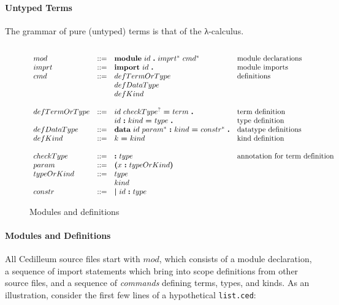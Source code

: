 \documentclass{article}
\begin{document}
\paragraph{Untyped Terms}
The grammar of pure (untyped) terms is that of the λ-calculus.

\begin{figure}[h]
  \[
    \begin{array}{llll}
      \\ mod
      & ::= & \textbf{module}\ id\ \textbf{.}\ imprt^*\ cmd^*\
      & \textnormal{module declarations}
      \\ imprt
      & ::= & \textbf{import}\ id\ \textbf{.}
      & \textnormal{module imports}
      \\ cmd
      & ::= & defTermOrType
      & \textnormal{definitions}
      \\ & & defDataType
      \\ & & defKind
      \\ 
      \\ defTermOrType
      & ::= & id\ checkType^?\ \textbf{=}\ term\ \textbf{.}
      & \textnormal{term definition}
      \\ & & id\ \textbf{:}\ kind\ \textbf{=}\ type\ \textbf{.}
      & \textnormal{type definition}
      \\ defDataType
      & ::= & \textbf{data}\ id\ param^*\ \textbf{:}\ kind\ \textbf{=}\
              constr^*\ \textbf{.}
      & \textnormal{datatype definitions}
      \\ defKind
      & ::= & k\ \textbf{=}\ kind
      & \text{kind definition}
      \\ 
      \\ checkType
      & ::= & \textbf{:}\ type
      & \textnormal{annotation for term definition}
      \\ param
      & ::= & \textbf{(}x\ \textbf{:}\ typeOrKind \textbf{)}
      \\ typeOrKind
      & ::= & type
      \\ & & kind
      \\ constr
      & ::= & \textbf{\textbar}\ id\ \textbf{:}\ type
    \end{array}
  \]
  \caption{Modules and definitions}
  \label{fig:mods-defs}
\end{figure}

\paragraph{Modules and Definitions}
All Cedilleum source files start with $mod$, which consists of a module
declaration, a sequence of import statements which bring into scope definitions
from other source files, and a sequence of \textit{commands} defining terms,
types, and kinds. As an illustration, consider the first few lines of a
hypothetical \texttt{list.ced}:
\end{document}
